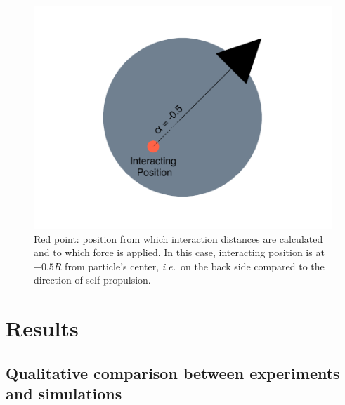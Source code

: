 \documentclass[../../master_thesis_np.tex]{subfiles}
\begin{document}
	\begin{figure}[htp]
		\centering
		\includegraphics[width=\textwidth]{singpart_draw.png}
		\caption{\color{brown}Red point: position from which interaction distances are calculated and to which force is applied. In this case, interacting position is at $-0.5R$ from particle's center, {\it i.e.}\ on the back side compared to  the direction of self propulsion.}
		\label{fig:geom_model}
	\end{figure}
	
	{\color{green}\section{Results}}
	{\color{brown}\subsection{Qualitative comparison between experiments and simulations}} \label{qualitative}
	
	
\end{document}
